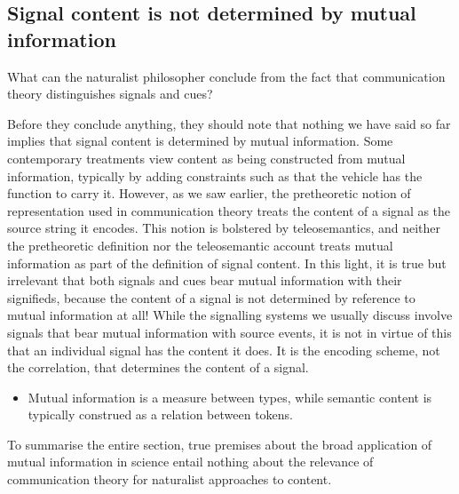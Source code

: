 \subsection{Signal content is not determined by mutual information}

What can the naturalist philosopher conclude from the fact that communication theory distinguishes signals and cues?

Before they conclude anything, they should note that nothing we have said so far implies that signal content is determined by mutual information.
Some contemporary treatments view content as being constructed from mutual information, typically by adding constraints such as that the vehicle has the function to carry it.
However, as we saw earlier, the pretheoretic notion of representation used in communication theory treats the content of a signal as the source string it encodes.
This notion is bolstered by teleosemantics, and neither the pretheoretic definition nor the teleosemantic account treats mutual information as part of the definition of signal content.
In this light, it is true but irrelevant that both signals and cues bear mutual information with their signifieds, because the content of a signal is not determined by reference to mutual information at all!
While the signalling systems we usually discuss involve signals that bear mutual information with source events, it is not in virtue of this that an individual signal has the content it does.
It is the encoding scheme, not the correlation, that determines the content of a signal.

\begin{itemize}
    \item Mutual information is a measure between types, while semantic content is typically construed as a relation between tokens.
\end{itemize}

To summarise the entire section, true premises about the broad application of mutual information in science entail nothing about the relevance of communication theory for naturalist approaches to content.
